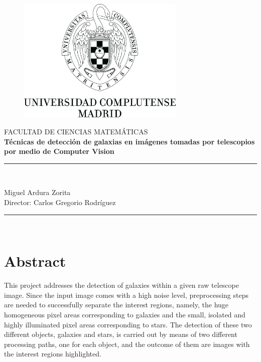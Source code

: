 \documentclass[a4paper,12pt]{article}
\begin{document}
\lstset{inputencoding=utf8/latin1}
\renewcommand{\figurename}{Figura}
\begin{titlepage}
\begin{center}
\begin{figure}
\begin{center}
\includegraphics[width=8cm]{logo.jpg}
\end{center}
\end{figure}
FACULTAD DE CIENCIAS MATEMÁTICAS\\
\vspace{1cm}
\huge{\textbf{Técnicas de detección de galaxias en imágenes tomadas por telescopios por medio de Computer Vision}}\\
\vspace{3cm}
\rule{80mm}{0.1mm}\\
\begin{large}
Miguel Ardura Zorita\\
Director: Carlos Gregorio Rodríguez\\
\end{large}
\rule{80mm}{0.1mm}\\
\vspace*{0.1in}

\end{center}

\end{titlepage}

\newpage
\section*{Abstract}
This project addresses the detection of galaxies within a given raw telescope image. Since the input image comes with a high noise level, preprocessing steps are needed to successfully separate the interest regions, namely, the huge homogeneous pixel areas corresponding to galaxies and the small, isolated and highly illuminated pixel areas corresponding to stars. The detection of these two different objects, galaxies and stars, is carried out by means of two different processing paths, one for each object, and the outcome of them are images with the interest regions highlighted.
\\
\end{document}
